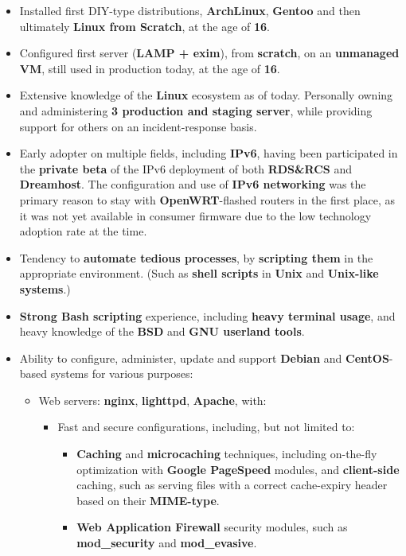 \documentclass[12pt,a4paper]{article}
\begin{document}
\begin{itemize}
\begin{itemize}
		\item	Installed first DIY-type distributions, \textbf{ArchLinux}, \textbf{Gentoo} and then ultimately \textbf{Linux from Scratch}, at the age of \textbf{16}.
		\item	Configured first server (\textbf{LAMP + exim}), from \textbf{scratch}, on an \textbf{unmanaged VM}, still used in production today, at the age of \textbf{16}.
		\item	Extensive knowledge of the \textbf{Linux} ecosystem as of today. Personally owning and administering \textbf{3 production and staging server}, while providing support for others on an incident-response basis.
		\item	Early adopter on multiple fields, including \textbf{IPv6}, having been participated in the \textbf{private beta} of the IPv6 deployment of both \textbf{RDS\&RCS} and \textbf{Dreamhost}. The configuration and use of \textbf{IPv6 networking} was the primary reason to stay with \textbf{OpenWRT}-flashed routers in the first place, as it was not yet available in consumer firmware due to the low technology adoption rate at the time.
		\item	Tendency to \textbf{automate tedious processes}, by \textbf{scripting them} in the appropriate environment. (Such as \textbf{shell scripts} in \textbf{Unix} and \textbf{Unix-like systems}.)
		\item	\textbf{Strong Bash scripting} experience, including \textbf{heavy terminal usage}, and heavy knowledge of the \textbf{BSD} and \textbf{GNU userland tools}.
		\item	Ability to configure, administer, update and support \textbf{Debian} and \textbf{CentOS}-based systems for various purposes:
			\begin{itemize}
			\item	Web servers: \textbf{nginx}, \textbf{lighttpd}, \textbf{Apache}, with:
				\begin{itemize}
				\item	Fast and secure configurations, including, but not limited to:
					\begin{itemize}
					\item	\textbf{Caching} and \textbf{microcaching} techniques, including on-the-fly optimization with \textbf{Google PageSpeed} modules, and \textbf{client-side} caching, such as serving files with a correct cache-expiry header based on their \textbf{MIME-type}.
					\item	\textbf{Web Application Firewall} security modules, such as \textbf{mod\_security} and \textbf{mod\_evasive}.

\end{itemize}
\end{itemize}
\end{itemize}
\end{itemize}
\end{itemize}
\end{document}
